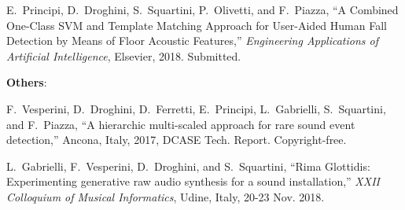 \begin{list}{[]~}{}
\item
E.~Principi, D.~Droghini, S.~Squartini, P.~Olivetti, and F.~Piazza, ``A Combined One-Class SVM and Template Matching Approach for User-Aided Human Fall Detection by Means of Floor Acoustic Features,'' \emph{Engineering Applications of Artificial Intelligence}, Elsevier, 2018. Submitted.
\newpage

\textbf{Others}:
\begin{list}{[]~}{}
	\item
	F.~Vesperini, D.~Droghini, D.~Ferretti, E.~Principi, L.~Gabrielli, S.~Squartini, and F.~Piazza, ``A hierarchic multi-scaled approach for rare sound event detection,'' Ancona, Italy, 2017, {DCASE} {T}ech. {R}eport. {C}opyright-free.
	
	\item
	L.~Gabrielli, F.~Vesperini, D.~Droghini, and S.~Squartini, ``Rima {G}lottidis: Experimenting generative raw audio synthesis for a sound installation,'' \emph{XXII Colloquium of Musical Informatics}, Udine, Italy, 20-23 Nov. 2018.
	
\end{list}

  
\end{list}
